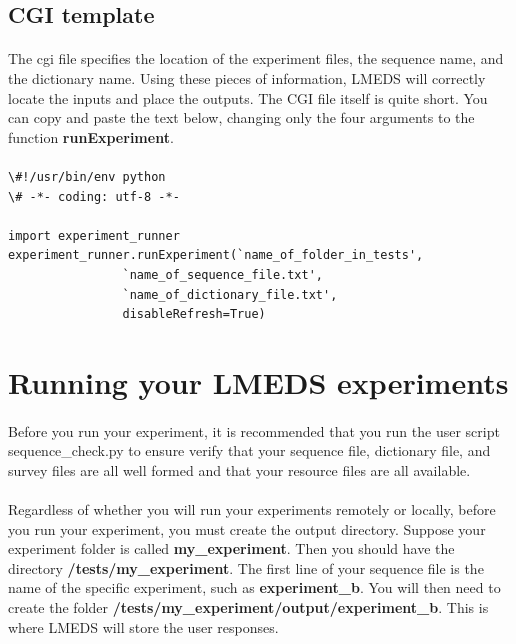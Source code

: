 \documentclass[12pt, oneside]{scrbook}   	%
\begin{document}
\subsection{CGI template}
\label{sec:cgitemplate}

\paragraph{}
The cgi file  specifies the location of the experiment files, the sequence name, and the dictionary name.  Using these pieces of information, LMEDS will correctly locate the inputs and place the outputs.  The CGI file itself is quite short.  You can copy and paste the text below, changing only the four arguments to the function \textbf{runExperiment}.

\paragraph{}

\begin{tcolorbox}[breakable,colback=white,colframe=blue,width=\dimexpr\textwidth+12mm\relax,enlarge left by=-6mm,enlarge right by=6mm]

\begin{lstlisting}
\#!/usr/bin/env python
\# -*- coding: utf-8 -*-

import experiment_runner
experiment_runner.runExperiment(`name_of_folder_in_tests', 
				`name_of_sequence_file.txt', 
				`name_of_dictionary_file.txt', 
				disableRefresh=True)
\end{lstlisting}

\end{tcolorbox}


\section{Running your LMEDS experiments}

\paragraph{}
Before you run your experiment, it is recommended that you run the user script sequence\_check.py to ensure verify that your sequence file, dictionary file, and survey files are all well formed and that your resource files are all available.


\paragraph{}
Regardless of whether you will run your experiments remotely or locally, before you run your experiment, you must create the output directory.  Suppose your experiment folder is called \textbf{my\_experiment}.  Then you should have the directory \textbf{/tests/my\_experiment}.  The first line of your sequence file is the name of the specific experiment, such as \textbf{experiment\_b}.  You will then need to create the folder \textbf{/tests/my\_experiment/output/experiment\_b}.  This is where LMEDS will store the user responses.
\end{document}

